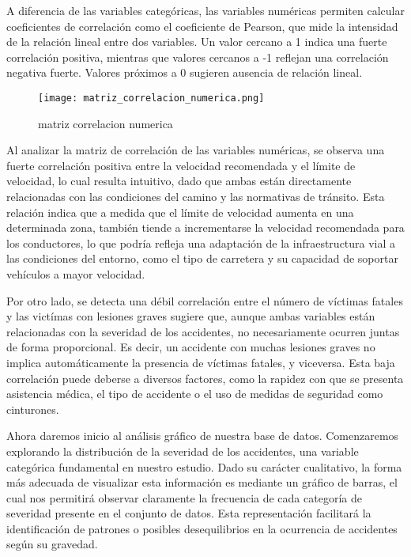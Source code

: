 \documentclass{book}
\begin{document}
A diferencia de las variables categóricas, las variables numéricas permiten calcular coeficientes de correlación como el coeficiente de Pearson, que mide la intensidad de la relación lineal entre dos variables. Un valor cercano a 1 indica una fuerte correlación positiva, mientras que valores cercanos a -1 reflejan una correlación negativa fuerte. Valores próximos a 0 sugieren ausencia de relación lineal.

\begin{figure}[htbp]
\centering
\texttt{[image: matriz\_correlacion\_numerica.png]}
\caption{\label{fig:matriz correlacion numerica}matriz correlacion numerica}
\end{figure}

Al analizar la matriz de correlación de las variables numéricas, se observa una fuerte correlación positiva entre la velocidad recomendada y el límite de velocidad, lo cual resulta intuitivo, dado que ambas están directamente relacionadas con las condiciones del camino y las normativas de tránsito. Esta relación indica que a medida que el límite de velocidad aumenta en una determinada zona, también tiende a incrementarse la velocidad recomendada para los conductores, lo que podría refleja una adaptación de la infraestructura vial a las condiciones del entorno, como el tipo de carretera y su capacidad de soportar vehículos a mayor velocidad.

Por otro lado, se detecta una débil correlación entre el número de víctimas fatales y las victímas con lesiones graves sugiere que, aunque ambas variables están relacionadas con la severidad de los accidentes, no necesariamente ocurren juntas de forma proporcional. Es decir, un accidente con muchas lesiones graves no implica automáticamente la presencia de víctimas fatales, y viceversa. Esta baja correlación puede deberse a diversos factores, como la rapidez con que se presenta asistencia médica, el tipo de accidente o el uso de medidas de seguridad como cinturones.

Ahora daremos inicio al análisis gráfico de nuestra base de datos. Comenzaremos explorando la distribución de la severidad de los accidentes, una variable categórica fundamental en nuestro estudio. Dado su carácter cualitativo, la forma más adecuada de visualizar esta información es mediante un gráfico de barras, el cual nos permitirá observar claramente la frecuencia de cada categoría de severidad presente en el conjunto de datos. Esta representación facilitará la identificación de patrones o posibles desequilibrios en la ocurrencia de accidentes según su gravedad.
\end{document}
